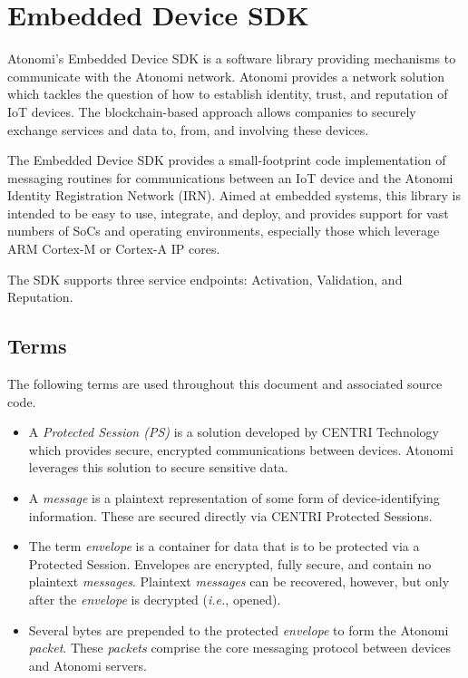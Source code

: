 \chapter{Embedded Device SDK}

Atonomi's Embedded Device SDK is a software library providing mechanisms to communicate
with the Atonomi network. Atonomi provides a network solution which tackles
the question of how to establish identity, trust, and reputation of IoT devices.
The blockchain-based approach allows companies to securely exchange services
and data to, from, and involving these devices.

The Embedded Device SDK provides a small-footprint code implementation of
messaging routines for communications between an IoT device and the Atonomi
Identity Registration Network (IRN). Aimed at embedded systems, this library
is intended to be easy to use, integrate, and deploy, and provides support
for vast numbers of SoCs and operating environments, especially those which
leverage ARM Cortex-M or Cortex-A IP cores.

The SDK supports three service endpoints: Activation, Validation, and Reputation.


\section{Terms}
The following terms are used throughout this document and associated source code.

\begin{itemize}
	\item A \textit{Protected Session (PS)} is a solution developed by CENTRI
		Technology which provides secure, encrypted communications between
		devices. Atonomi leverages this solution to secure sensitive
		data.
	\item A \textit{message} is a plaintext representation of some form of
		device-identifying information. These are secured directly via
		CENTRI Protected Sessions.
	\item The term \textit{envelope} is a container for data that is to be
		protected via a Protected Session. Envelopes are encrypted, fully
		secure, and contain no plaintext \textit{messages}. Plaintext
		\textit{messages} can be recovered, however, but only after
		the \textit{envelope} is decrypted (\textit{i.e.}, opened).
	\item Several bytes are prepended to the protected \textit{envelope} to
		form the Atonomi \textit{packet}. These \textit{packets} comprise
		the core messaging protocol between devices and Atonomi servers.
\end{itemize}



